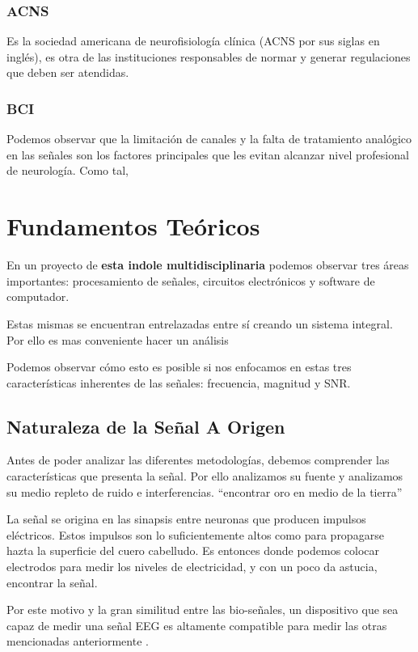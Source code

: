 \documentclass[11pt]{article}
\begin{document}
\subsubsection{ACNS}
\label{sec:org0e0098c}
Es la sociedad americana de neurofisiología clínica (ACNS por sus siglas en inglés), es otra de las instituciones responsables de normar y generar regulaciones que deben ser atendidas.
\subsubsection{BCI}
\label{sec:orgbd7f6d1}
Podemos observar que la limitación de canales y la falta de tratamiento analógico en las señales son los factores principales que les evitan alcanzar nivel profesional de neurología. Como tal,

\section{Fundamentos Teóricos}
\label{sec:org4a808d6}
En un proyecto de \textbf{esta indole multidisciplinaria} podemos observar tres áreas importantes: procesamiento de señales, circuitos electrónicos y software de computador.

Estas mismas se encuentran entrelazadas entre sí creando un sistema integral. Por ello es mas conveniente hacer un análisis

Podemos observar cómo esto es posible si nos enfocamos en estas tres características inherentes de las señales: frecuencia, magnitud y SNR.

\subsection{Naturaleza de la Señal A Origen}
\label{sec:orgaf67549}
Antes de poder analizar las diferentes metodologías, debemos comprender las características que presenta la señal. Por ello analizamos su fuente y analizamos su medio repleto de ruido e interferencias. “encontrar oro en medio de la tierra”

La señal se origina en las sinapsis entre neuronas que producen impulsos eléctricos. Estos impulsos son lo suficientemente altos como para propagarse hazta la superficie del cuero cabelludo. Es entonces donde podemos colocar electrodos para medir los niveles de electricidad, y con un poco da astucia, encontrar la señal.

Por este motivo y la gran similitud entre las bio-señales, un dispositivo que sea capaz de medir una señal EEG es altamente compatible para medir las otras mencionadas anteriormente \cite{Ahamed2015}.
\end{document}
